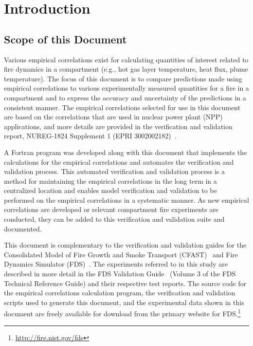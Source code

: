 
\chapter{Introduction}
\label{Introduction_Chapter}

\section{Scope of this Document}

Various empirical correlations exist for calculating quantities of interest related to fire dynamics in a compartment (e.g., hot gas layer temperature, heat flux, plume temperature). The focus of this document is to compare predictions made using empirical correlations to various experimentally measured quantities for a fire in a compartment and to express the accuracy and uncertainty of the predictions in a consistent manner. The empirical correlations selected for use in this document are based on the correlations that are used in nuclear power plant (NPP) applications, and more details are provided in the verification and validation report, NUREG-1824 Supplement 1 (EPRI 3002002182)~\cite{NUREG_1824_Sup_1}.

A Fortran program was developed along with this document that implements the calculations for the empirical correlations and automates the verification and validation process. This automated verification and validation process is a method for maintaining the empirical correlations in the long term in a centralized location and enables model verification and validation to be performed on the empirical correlations in a systematic manner. As new empirical correlations are developed or relevant compartment fire experiments are conducted, they can be added to this verification and validation suite and documented.

This document is complementary to the verification and validation guides for the Consolidated Model of Fire Growth and Smoke Transport (CFAST)~\cite{CFAST_Tech_Guide_6} and Fire Dynamics Simulator (FDS)~\cite{FDS_Verification_Guide, FDS_Validation_Guide}. The experiments referred to in this study are described in more detail in the FDS Validation Guide~\cite{FDS_Validation_Guide} (Volume 3 of the FDS Technical Reference Guide) and their respective test reports. The source code for the empirical correlations calculation program, the verification and validation scripts used to generate this document, and the experimental data shown in this document are freely available for download from the primary website for FDS.\footnote{\href{http://fire.nist.gov/fds}{http://fire.nist.gov/fds}}


